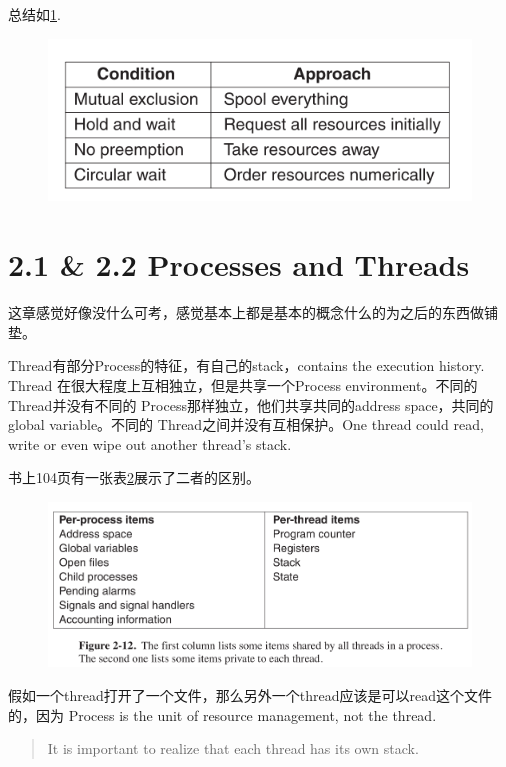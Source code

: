 \documentclass[a4paper]{article}
\begin{document}
总结如\ref{deadlocksummary}.
\begin{figure}
  \centering
  \includegraphics{deadlocksummary.png}
  \caption{}
  \label{deadlocksummary}
\end{figure}

\section{2.1 \& 2.2 Processes and Threads}
这章感觉好像没什么可考，感觉基本上都是基本的概念什么的为之后的东西做铺垫。

Thread有部分Process的特征，有自己的stack，contains the execution history. Thread
在很大程度上互相独立，但是共享一个Process environment。不同的Thread并没有不同的
Process那样独立，他们共享共同的address space，共同的global variable。不同的
Thread之间并没有互相保护。One thread could read, write or even wipe out another
thread's stack.

书上104页有一张表\ref{thread}展示了二者的区别。
\begin{figure}
  \centering
  \includegraphics{thread.png}
  \caption{}
  \label{thread}
\end{figure}

假如一个thread打开了一个文件，那么另外一个thread应该是可以read这个文件的，因为
Process is the unit of resource management, not the thread.

\begin{quote}
  It is important to realize that each thread has its own stack.
\end{quote}
\end{document}
